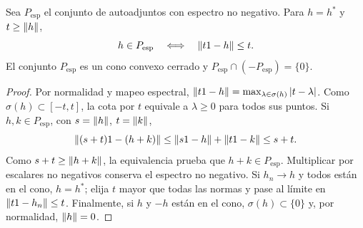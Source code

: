 \begin{lema}\label{v3:cono-espectral}
Sea $P_{\mathrm{esp}}$ el conjunto de autoadjuntos con espectro no negativo. Para $h=h^*$ y $t\ge\left\lVert h\right\rVert$,
\[
 h\in P_{\mathrm{esp}}\quad\Longleftrightarrow\quad\left\lVert t1-h\right\rVert\le t.
\]
El conjunto $P_{\mathrm{esp}}$ es un cono convexo cerrado y $P_{\mathrm{esp}}\cap(-P_{\mathrm{esp}})=\{0\}$.
\end{lema}
\begin{proof}
Por normalidad y mapeo espectral, $\left\lVert t1-h\right\rVert=\max_{\lambda\in\sigma(h)}|t-\lambda|$. Como $\sigma(h)\subset[-t,t]$, la cota por $t$ equivale a $\lambda\ge0$ para todos sus puntos. Si $h,k\in P_{\mathrm{esp}}$, con $s=\left\lVert h\right\rVert$, $t=\left\lVert k\right\rVert$,
\[
 \left\lVert(s+t)1-(h+k)\right\rVert\le\left\lVert s1-h\right\rVert+\left\lVert t1-k\right\rVert\le s+t.
\]
Como $s+t\ge\left\lVert h+k\right\rVert$, la equivalencia prueba que $h+k\in P_{\mathrm{esp}}$. Multiplicar por escalares no negativos conserva el espectro no negativo. Si $h_n\to h$ y todos están en el cono, $h=h^*$; elija $t$ mayor que todas las normas y pase al límite en $\left\lVert t1-h_n\right\rVert\le t$. Finalmente, si $h$ y $-h$ están en el cono, $\sigma(h)\subset\{0\}$ y, por normalidad, $\left\lVert h\right\rVert=0$.
\end{proof}

